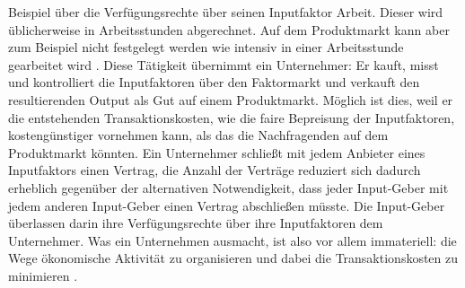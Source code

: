 Beispiel über die Verfügungsrechte über seinen Inputfaktor Arbeit. Dieser wird üblicherweise in Arbeitsstunden abgerechnet. Auf dem Produktmarkt kann aber zum Beispiel nicht festgelegt werden wie intensiv in einer Arbeitsstunde gearbeitet wird \parencite[S. 5]{Cheung1983}. Diese Tätigkeit übernimmt ein Unternehmer: Er kauft, misst und kontrolliert die Inputfaktoren über den Faktormarkt und verkauft den resultierenden Output als Gut auf einem Produktmarkt. Möglich ist dies, weil er die entstehenden Transaktionskosten, wie die faire Bepreisung der Inputfaktoren, kostengünstiger vornehmen kann, als das die Nachfragenden auf dem Produktmarkt könnten. Ein Unternehmer schließt mit jedem Anbieter eines Inputfaktors einen Vertrag, die Anzahl der Verträge reduziert sich dadurch erheblich gegenüber der alternativen Notwendigkeit, dass jeder Input-Geber mit jedem anderen Input-Geber einen Vertrag abschließen müsste. Die Input-Geber überlassen darin ihre Verfügungsrechte über ihre Inputfaktoren dem Unternehmer. Was ein Unternehmen ausmacht, ist also vor allem immateriell: die Wege ökonomische Aktivität zu organisieren und dabei die Transaktionskosten zu minimieren \parencite[S. 10]{Cheung1983}. 

